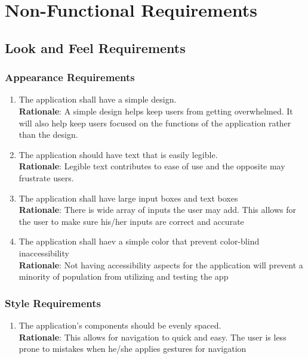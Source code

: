 \section{Non-Functional Requirements}
\label{sec:non-functional_requirements}


\subsection{Look and Feel Requirements}
\label{sub:look_and_feel_requirements}


\subsubsection{Appearance Requirements}
\label{ssub:appearance_requirements}
\begin{enumerate}[{LF-A}1. ]
	\item The application shall have a simple design. \\ \textbf{Rationale}: A simple design helps keep users from getting overwhelmed. It will also help keep users focused on the 
	functions of the application rather than the design.
	\item The application should have text that is easily legible. \\ \textbf{Rationale}: Legible text contributes to ease of use and the opposite may frustrate users.
	\item The application shall have large input boxes and text boxes \\ \textbf{Rationale}: There is wide array of inputs the user may add. This allows for the user to make sure his/her inputs are correct and accurate
	\item The application shall haev a simple color that prevent color-blind inaccessibility \\ \textbf{Rationale}: Not having accessibility aspects for the application will prevent a minority of population from utilizing and testing the app  
\end{enumerate}


\subsubsection{Style Requirements}
\label{ssub:style_requirements}
\begin{enumerate}[{LF-S}1. ]
	\item The application’s components should be evenly spaced. \\ \textbf{Rationale}: This allows for navigation to quick and easy. The user is less prone to mistakes when he/she applies gestures for navigation
\end{enumerate}

